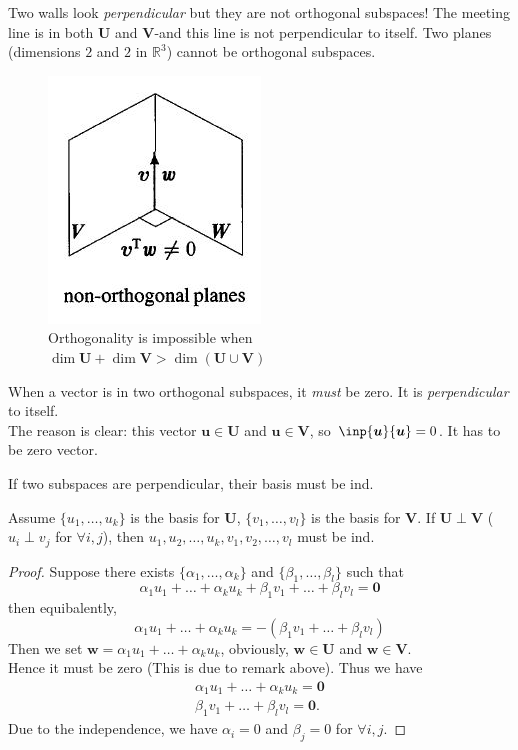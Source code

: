 \begin{example}
Two walls look \textit{perpendicular} but they are not orthogonal subspaces! The meeting line is in both $\bm U$ and $\bm V$-and this line is not perpendicular to itself. Two planes (dimensions $2$ and $2$ in $\mathbb{R}^{3}$) cannot be orthogonal subspaces.\\
\begin{figure}[H]
\centering
\includegraphics{week5/orthogonality}
\caption{Orthogonality is impossible when $\dim\bm U+\dim\bm V>\dim(\bm U\cup\bm V)$}
\end{figure}
\end{example}
\begin{remark}
When a vector is in two orthogonal subspaces, it \textit{must} be zero. It is \emph{perpendicular} to
itself. 
\\The reason is clear: this vector $\bm u\in\bm U$ and $\bm u\in\bm V$, so $\inp{\bm u}{\bm u}=0$. It has to be zero vector.
\end{remark}
If two subspaces are perpendicular, their basis must be ind.
\begin{theorem}
Assume $\{u_1,\dots,u_k\}$ is the basis for $\bm U$, $\{v_1,\dots,v_l\}$ is the basis for $\bm V.$ If $\bm U\perp\bm V$ ($u_i\perp v_j$ for $\forall i,j$), then $u_1,u_2,\dots,u_k,v_1,v_2,\dots,v_l$ must be ind.
\end{theorem}
\begin{proof}
Suppose there exists $\{\alpha_1,\dots,\alpha_k\}$ and $\{\beta_1,\dots,\beta_l\}$ such that
\[
\alpha_1u_1+\dots+\alpha_ku_k+\beta_1v_1+\dots+\beta_lv_l=\bm 0
\]
then equibalently,
\[
\alpha_1u_1+\dots+\alpha_ku_k=-(\beta_1v_1+\dots+\beta_lv_l)
\]
Then we set $\bm w=\alpha_1u_1+\dots+\alpha_ku_k$, obviously, $\bm w\in\bm U$ and $\bm w\in\bm V$.\\ Hence it must be zero (This is due to remark above). Thus we have
\begin{gather*}
\alpha_1u_1+\dots+\alpha_ku_k=\bm 0\\
\beta_1v_1+\dots+\beta_lv_l=\bm 0.
\end{gather*}
Due to the independence, we have $\alpha_i=0$ and $\beta_j=0$ for $\forall i,j$. 
\end{proof}
